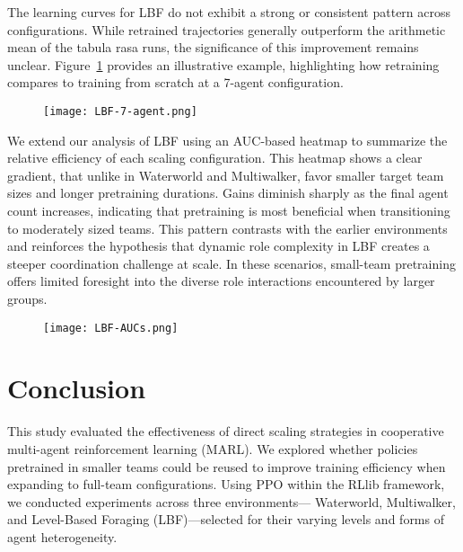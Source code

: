 \documentclass{article}
\begin{document}
The learning curves for LBF do not exhibit a strong or consistent pattern across configurations. 
While retrained trajectories generally outperform the arithmetic mean of the tabula rasa runs, 
the significance of this improvement remains unclear. 
Figure~\ref{fig:lbf-7} provides an illustrative example, highlighting how retraining compares 
to training from scratch at a 7-agent configuration.

\begin{figure}[!h]
    \centering
    \texttt{[image: LBF-7-agent.png]}
    \caption{}
    \label{fig:lbf-7}
\end{figure}

We extend our analysis of LBF using an AUC-based heatmap to summarize the 
relative efficiency of each scaling configuration. 
This heatmap shows a clear gradient, that unlike in Waterworld and Multiwalker, 
favor smaller target team sizes and longer pretraining durations. 
Gains diminish sharply as the final agent count increases, 
indicating that pretraining is most beneficial when transitioning to moderately sized teams. 
This pattern contrasts with the earlier environments and reinforces the hypothesis that 
dynamic role complexity in LBF creates a steeper coordination challenge at scale. 
In these scenarios, small-team pretraining offers limited foresight into the diverse role 
interactions encountered by larger groups.

\begin{figure}[h]
    \centering
    \texttt{[image: LBF-AUCs.png]}
    \caption{}
    \label{fig:lbf-aucs}
\end{figure}

\FloatBarrier

\section{Conclusion}

This study evaluated the effectiveness of direct scaling strategies in cooperative multi-agent 
reinforcement learning (MARL). We explored whether policies pretrained in smaller teams could 
be reused to improve training efficiency when expanding to full-team configurations. 
Using PPO within the RLlib framework, we conducted experiments across three environments—
Waterworld, Multiwalker, and Level-Based Foraging (LBF)—selected for their varying 
levels and forms of agent heterogeneity.
\end{document}
